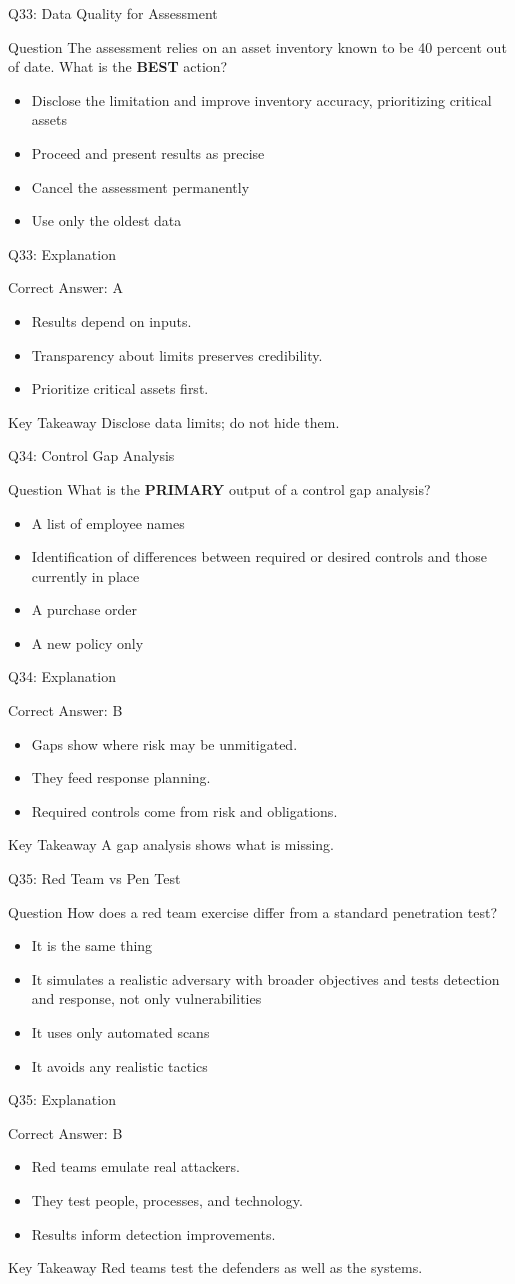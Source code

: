 \documentclass[aspectratio=169]{beamer}
\newcommand{\hq}[7]{%
	\begin{frame}{Q#1: #2}
		\begin{block}{Question}
			#3
		\end{block}
		\begin{itemize}
			#4
		\end{itemize}
	\end{frame}
	\begin{frame}{Q#1: Explanation}
		\begin{block}{Correct Answer: #5}
			\begin{itemize}
				#6
			\end{itemize}
		\end{block}
		\begin{alertblock}{Key Takeaway}
			#7
		\end{alertblock}
	\end{frame}
}
\begin{document}
	\hq{33}{Data Quality for Assessment}
	{The assessment relies on an asset inventory known to be 40 percent out of date. What is the \textbf{BEST} action?}
	{\item[\textbf{(A)}] Disclose the limitation and improve inventory accuracy, prioritizing critical assets
		\item[\textbf{(B)}] Proceed and present results as precise
		\item[\textbf{(C)}] Cancel the assessment permanently
		\item[\textbf{(D)}] Use only the oldest data}
	{A}
	{\item Results depend on inputs.
		\item Transparency about limits preserves credibility.
		\item Prioritize critical assets first.}
	{Disclose data limits; do not hide them.}
	
	\hq{34}{Control Gap Analysis}
	{What is the \textbf{PRIMARY} output of a control gap analysis?}
	{\item[\textbf{(A)}] A list of employee names
		\item[\textbf{(B)}] Identification of differences between required or desired controls and those currently in place
		\item[\textbf{(C)}] A purchase order
		\item[\textbf{(D)}] A new policy only}
	{B}
	{\item Gaps show where risk may be unmitigated.
		\item They feed response planning.
		\item Required controls come from risk and obligations.}
	{A gap analysis shows what is missing.}
	
	\hq{35}{Red Team vs Pen Test}
	{How does a red team exercise differ from a standard penetration test?}
	{\item[\textbf{(A)}] It is the same thing
		\item[\textbf{(B)}] It simulates a realistic adversary with broader objectives and tests detection and response, not only vulnerabilities
		\item[\textbf{(C)}] It uses only automated scans
		\item[\textbf{(D)}] It avoids any realistic tactics}
	{B}
	{\item Red teams emulate real attackers.
		\item They test people, processes, and technology.
		\item Results inform detection improvements.}
	{Red teams test the defenders as well as the systems.}
	
\end{document}
